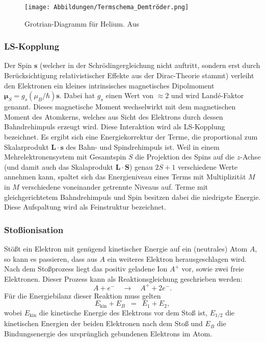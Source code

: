 \documentclass{article}
\newcommand{\widespace}{\enspace}
\newcommand{\wideeq}{\widespace = \widespace}
\begin{document}
\begin{figure}[H]
    \centering
    \texttt{[image: Abbildungen/Termschema\_Demtröder.png]}
    \caption{Grotrian-Diagramm für Helium. Aus \cite[183]{demtröder}}
    \label{Grotrian_Helium}
\end{figure}


\subsubsection{LS-Kopplung}
\label{LS-Kopplung}

Der Spin $\mathbf s$ (welcher in der Schrödingergleichung nicht auftritt, sondern
erst durch Berücksichtigung relativistischer Effekte aus der Dirac-Theorie stammt)
verleiht den Elektronen ein kleines intrinsisches magnetisches Dipolmoment
$\boldsymbol \mu_S = g_s (\mu_B / \hbar) \mathbf s$. Dabei hat $g_s$ einen Wert
von $\approx 2$ und wird Landé-Faktor genannt.
Dieses magnetische Moment wechselwirkt mit dem magnetischen Moment des Atomkerns,
welches aus Sicht des Elektrons durch dessen Bahndrehimpuls erzeugt wird.
Diese Interaktion wird als LS-Kopplung bezeichnet.
Es ergibt sich eine Energiekorrektur der Terme, die proportional zum Skalarprodukt
$\mathbf L \cdot \mathbf s$ des Bahn- und Spindrehimpuls ist.
Weil in einem Mehrelektronensystem mit Gesamtspin $S$ die Projektion des Spins
auf die $z$-Achse (und damit auch das Skalaprodukt
$\mathbf L \cdot \mathbf S$) genau $2S + 1$ verschiedene Werte annehmen kann,
spaltet sich das Energieniveau eines Terms mit Multiplizität $M$ in $M$ verschiedene
voneinander getrennte Niveaus auf.
Terme mit gleichgerichtetem Bahndrehimpuls und Spin besitzen dabei die
niedrigste Energie.
Diese Aufspaltung wird als Feinstruktur bezeichnet.

\cite[155--161]{demtröder}


\subsubsection{Stoßionisation}

Stößt ein Elektron mit genügend kinetischer Energie auf ein (neutrales) Atom $A$,
so kann es passieren, dass aus $A$ ein weiteres Elektron herausgeschlagen wird.
Nach dem Stoßprozess liegt das positiv geladene Ion $A^+$ vor, sowie zwei
freie Elektronen. Dieser Prozess kann als Reaktionsgleichung geschrieben werden:
\[
    A + e^- \quad \longrightarrow \quad A^+ + 2 e^-.
\]
Für die Energiebilanz dieser Reaktion muss gelten
\[
    E_\text{kin} + E_B \wideeq E_1 + E_2,
\]
wobei $E_\text{kin}$ die kinetische Energie des Elektrons vor dem Stoß ist,
$E_{1/2}$ die kinetischen Energien der beiden Elektronen nach dem Stoß
und $E_B$ die Bindungsenergie des ursprünglich gebundenen Elektrons im Atom.
\end{document}
